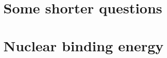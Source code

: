 \documentclass[]{article}
\begin{document}
\section{Some shorter questions}


\section{Nuclear binding energy}

\end{document}
